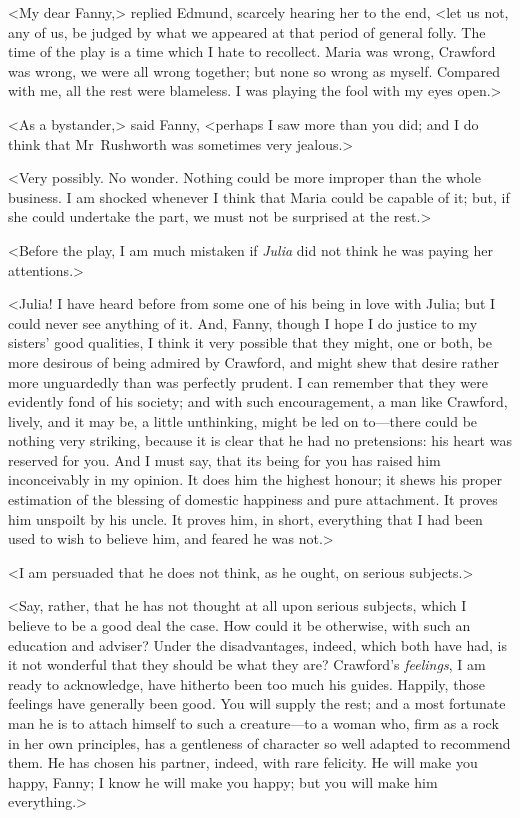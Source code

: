 <My dear Fanny,> replied Edmund, scarcely hearing her to the end, <let us not, any of us, be judged by what we appeared at that period of general folly. The time of the play is a time which I hate to recollect. Maria was wrong, Crawford was wrong, we were all wrong together; but none so wrong as myself. Compared with me, all the rest were blameless. I was playing the fool with my eyes open.>

<As a bystander,> said Fanny, <perhaps I saw more than you did; and I do think that Mr~Rushworth was sometimes very jealous.>

<Very possibly. No wonder. Nothing could be more improper than the whole business. I am shocked whenever I think that Maria could be capable of it; but, if she could undertake the part, we must not be surprised at the rest.>

<Before the play, I am much mistaken if \textit{Julia}  did not think he was paying her attentions.>

<Julia! I have heard before from some one of his being in love with Julia; but I could never see anything of it. And, Fanny, though I hope I do justice to my sisters' good qualities, I think it very possible that they might, one or both, be more desirous of being admired by Crawford, and might shew that desire rather more unguardedly than was perfectly prudent. I can remember that they were evidently fond of his society; and with such encouragement, a man like Crawford, lively, and it may be, a little unthinking, might be led on to—there could be nothing very striking, because it is clear that he had no pretensions: his heart was reserved for you. And I must say, that its being for you has raised him inconceivably in my opinion. It does him the highest honour; it shews his proper estimation of the blessing of domestic happiness and pure attachment. It proves him unspoilt by his uncle. It proves him, in short, everything that I had been used to wish to believe him, and feared he was not.>

<I am persuaded that he does not think, as he ought, on serious subjects.>

<Say, rather, that he has not thought at all upon serious subjects, which I believe to be a good deal the case. How could it be otherwise, with such an education and adviser? Under the disadvantages, indeed, which both have had, is it not wonderful that they should be what they are? Crawford's \textit{feelings}, I am ready to acknowledge, have hitherto been too much his guides. Happily, those feelings have generally been good. You will supply the rest; and a most fortunate man he is to attach himself to such a creature—to a woman who, firm as a rock in her own principles, has a gentleness of character so well adapted to recommend them. He has chosen his partner, indeed, with rare felicity. He will make you happy, Fanny; I know he will make you happy; but you will make him everything.>

